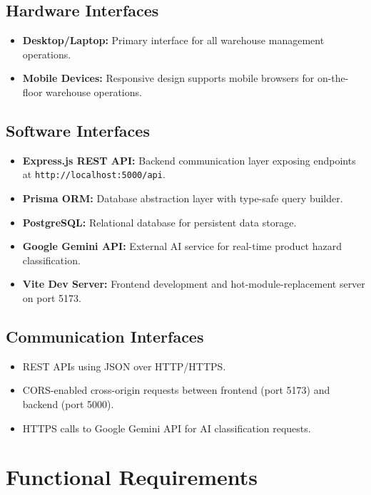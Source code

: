 \documentclass[12pt,a4paper]{report}
\begin{document}
\section{Hardware Interfaces}
\begin{itemize}
    \item \textbf{Desktop/Laptop:} Primary interface for all warehouse management operations.
    \item \textbf{Mobile Devices:} Responsive design supports mobile browsers for on-the-floor warehouse operations.
\end{itemize}

\section{Software Interfaces}
\begin{itemize}
    \item \textbf{Express.js REST API:} Backend communication layer exposing endpoints at \texttt{http://localhost:5000/api}.
    \item \textbf{Prisma ORM:} Database abstraction layer with type-safe query builder.
    \item \textbf{PostgreSQL:} Relational database for persistent data storage.
    \item \textbf{Google Gemini API:} External AI service for real-time product hazard classification.
    \item \textbf{Vite Dev Server:} Frontend development and hot-module-replacement server on port 5173.
\end{itemize}

\section{Communication Interfaces}
\begin{itemize}
    \item REST APIs using JSON over HTTP/HTTPS.
    \item CORS-enabled cross-origin requests between frontend (port 5173) and backend (port 5000).
    \item HTTPS calls to Google Gemini API for AI classification requests.
\end{itemize}

\chapter{Functional Requirements}
\end{document}

